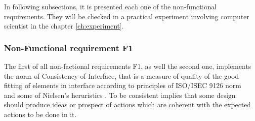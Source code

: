 	\begin{table}[h!]
			\label{tab:NonFuncReq}
		\begin{center}
			\end{center}

			\caption{Table for all non-functional requirements}
In following subsections, it is presented each one of the non-functional requirements. They will be checked in a practical experiment involving computer scientist in the chapter \ref{ch:experiment}.

\subsubsection{Non-Functional requirement F1}

The first of all non-factional requirements F1, as well the second one, implements the norm of Consistency of Interface, that is a measure of quality of the good fitting of elements in interface according to principles of ISO/ISEC 9126 norm and some of Nielsen's heruristics \cite{ISO9126a}. To be consistent implies that some design should produce ideas or prospect of actions which are coherent with the expected actions to be done in it.


\end{table}

